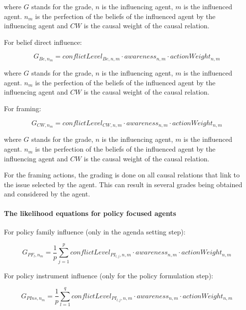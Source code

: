 \documentclass[11pt]{article}
\begin{document}
where $G$ stands for the grade, $n$ is the influencing agent, $m$ is the influenced agent. $n_m$ is the perfection of the beliefs of the influenced agent by the influencing agent and $CW$ is the causal weight of the causal relation.

For belief direct influence:

\begin{equation}\label{eq:likelihoodStateChange}
G_{Be, n_m} = conflictLevel_{Be, n,m} \cdot awareness_{n,m} \cdot actionWeight_{n,m}
\end{equation}

where $G$ stands for the grade, $n$ is the influencing agent, $m$ is the influenced agent. $n_m$ is the perfection of the beliefs of the influenced agent by the influencing agent and $CW$ is the causal weight of the causal relation.

For framing:

\begin{equation}\label{eq:likelihoodFraming}
G_{CW, n_m} = conflictLevel_{CW, n, m} \cdot awareness_{n,m} \cdot actionWeight_{n,m}
\end{equation}

where $G$ stands for the grade, $n$ is the influencing agent, $m$ is the influenced agent. $n_m$ is the perfection of the beliefs of the influenced agent by the influencing agent and $CW$ is the causal weight of the causal relation.

For the framing actions, the grading is done on all causal relations that link to the issue selected by the agent. This can result in several grades being obtained and considered by the agent.

\paragraph{The likelihood equations for policy focused agents}
\label{sssec:}

For policy family influence (only in the agenda setting step):

\begin{equation}\label{eq:likelihoodPFchangePolicy}
G_{PF_{l}, n_m} = \frac{1}{p} \sum_{j=1}^{p} conflictLevel_{PI_{l,j}, n,m} \cdot awareness_{n,m} \cdot actionWeight_{n,m} 
\end{equation}

For policy instrument influence (only for the policy formulation step):

\begin{equation}\label{eq:likelihoodPFchangeProblem}
G_{PIns, n_m} = \frac{1}{p} \sum_{l=1}^{q} conflictLevel_{PI_{l,j}, n,m} \cdot awareness_{n,m} \cdot actionWeight_{n,m} 
\end{equation}
\end{document}
